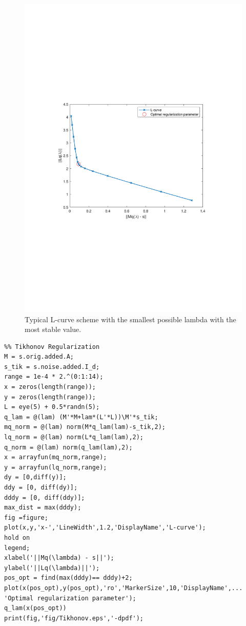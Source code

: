 \begin{figure}[h!]
    \centering
    \includegraphics[trim={50 270 100 270},clip]{img/Tikhonov_real.pdf}
    \caption{Typical L-curve scheme with the smallest possible lambda with the most stable value.}
    \label{fig:tikh}
\end{figure}

\begin{lstlisting}
%% Tikhonov Regularization
M = s.orig.added.A;
s_tik = s.noise.added.I_d;
range = 1e-4 * 2.^(0:1:14);
x = zeros(length(range));
y = zeros(length(range));
L = eye(5) + 0.5*randn(5);
q_lam = @(lam) (M'*M+lam*(L'*L))\M'*s_tik;
mq_norm = @(lam) norm(M*q_lam(lam)-s_tik,2);
lq_norm = @(lam) norm(L*q_lam(lam),2);
q_norm = @(lam) norm(q_lam(lam),2);
x = arrayfun(mq_norm,range);
y = arrayfun(lq_norm,range);
dy = [0,diff(y)];
ddy = [0, diff(dy)];
dddy = [0, diff(ddy)];
max_dist = max(dddy);
fig =figure;
plot(x,y,'x-','LineWidth',1.2,'DisplayName','L-curve');
hold on
legend;
xlabel('||Mq(\lambda) - s||');
ylabel('||Lq(\lambda)||');
pos_opt = find(max(dddy)== dddy)+2;
plot(x(pos_opt),y(pos_opt),'ro','MarkerSize',10,'DisplayName',...
'Optimal regularization parameter');
q_lam(x(pos_opt))
print(fig,'fig/Tikhonov.eps','-dpdf');
\end{lstlisting}



